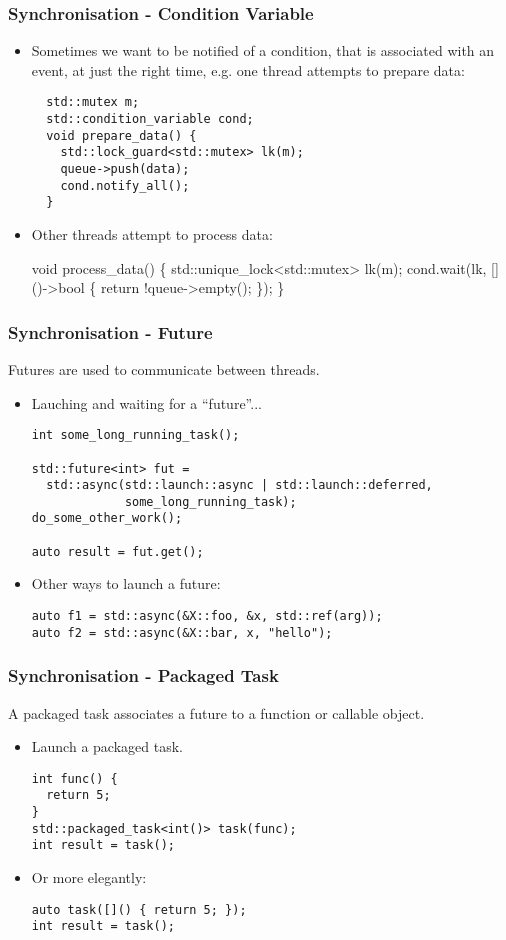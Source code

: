 \documentclass{beamer}
\begin{document}
\begin{frame}[fragile]
  \frametitle{Synchronisation - Condition Variable}
\begin{itemize}
\item
  Sometimes we want to be notified of a condition, that is associated with an event, at just the right time, e.g. one thread attempts to prepare data:
  \pause
      {\scriptsize
\begin{verbatim}
  std::mutex m;
  std::condition_variable cond;
  void prepare_data() {
    std::lock_guard<std::mutex> lk(m);
    queue->push(data);
    cond.notify_all();
  }
\end{verbatim}
}
\pause
\item Other threads attempt to process data:
{\scriptsize
\begin{semiverbatim}
  void process_data() \{
    std::{\color{red}unique_lock}<std::mutex> lk(m);
    cond.wait(lk, []()->bool \{ return !queue->empty(); \});
  \}
\end{semiverbatim}
}
\end{itemize}
\end{frame}

\begin{frame}[fragile]
\frametitle{Synchronisation - Future}
Futures are used to communicate between threads.
\begin{itemize}
\item Lauching and waiting for a ``future''...
{\scriptsize
\begin{verbatim}
int some_long_running_task();

std::future<int> fut =
  std::async(std::launch::async | std::launch::deferred,
             some_long_running_task);
do_some_other_work();

auto result = fut.get();
\end{verbatim}
}
\item Other ways to launch a future:
{\scriptsize
\begin{verbatim}
auto f1 = std::async(&X::foo, &x, std::ref(arg));
auto f2 = std::async(&X::bar, x, "hello");
\end{verbatim}
}
\end{itemize}
\end{frame}

\begin{frame}[fragile]
\frametitle{Synchronisation - Packaged Task}
A packaged task associates a future to a function or callable object.
\begin{itemize}
\item Launch a packaged task.
{\scriptsize
\begin{verbatim}
int func() {
  return 5;
}
std::packaged_task<int()> task(func);
int result = task();
\end{verbatim}
}
\item Or more elegantly:
{\scriptsize
\begin{verbatim}
auto task([]() { return 5; });
int result = task();
\end{verbatim}
}
\end{itemize}
\end{frame}
\end{document}

